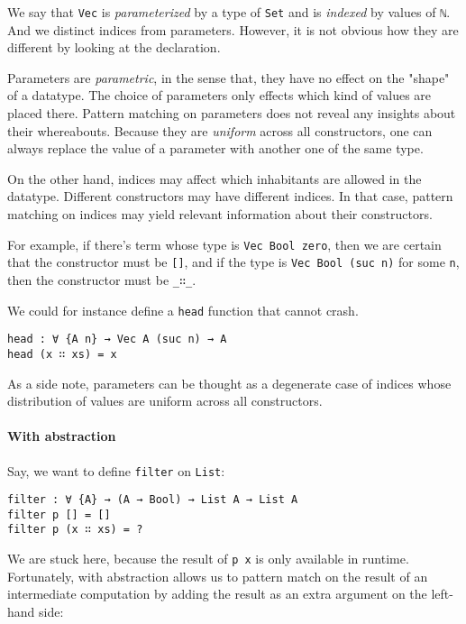 \documentclass[../thesis.tex]{subfiles}
\begin{document}
We say that {\lstinline|Vec|} is \textit{parameterized} by a type of {\lstinline|Set|}
and is \textit{indexed} by values of {\lstinline|ℕ|}.
And we distinct indices from parameters. However, it is not obvious how they are
different by looking at the declaration.

Parameters are \textit{parametric}, in the sense that, they have no effect on the "shape" of a datatype.
The choice of parameters only effects which kind of values are placed there.
Pattern matching on parameters does not reveal any insights about their whereabouts.
Because they are \textit{uniform} across all constructors, one can always replace
the value of a parameter with another one of the same type.

On the other hand, indices may affect which inhabitants are allowed in the
datatype. Different constructors may have different indices. In that case, pattern
matching on indices may yield relevant information about their constructors.

For example, if there's term whose type is   {\lstinline|Vec Bool zero|}, then
we are certain that the constructor must be {\lstinline|[]|}, and if the type
 is {\lstinline|Vec Bool (suc n)|} for some {\lstinline|n|}, then the constructor
must be {\lstinline|_∷_|}.

We could for instance define a {\lstinline|head|} function that cannot crash.

\begin{lstlisting}
head : ∀ {A n} → Vec A (suc n) → A
head (x ∷ xs) = x
\end{lstlisting}

As a side note, parameters can be thought as a degenerate case of indices whose
distribution of values are uniform across all constructors.

\paragraph{With abstraction}

Say, we want to define {\lstinline|filter|} on {\lstinline|List|}:

\begin{lstlisting}
filter : ∀ {A} → (A → Bool) → List A → List A
filter p [] = []
filter p (x ∷ xs) = ?
\end{lstlisting}

We are stuck here, because the result of {\lstinline|p x|} is only available in
runtime. Fortunately, with abstraction allows us to pattern match on the result
of an intermediate computation by adding the result as an extra argument on the
left-hand side:
\end{document}
